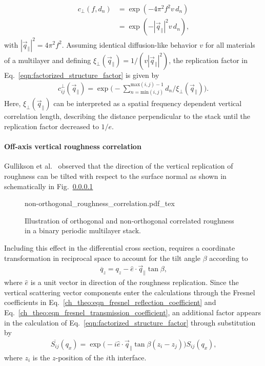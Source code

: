 \begin{align}
    c_\perp(f,d_n) &= \exp(-4\pi^2 f^2 v \,d_n) \nonumber \\
                   &= \exp(-|\vec{q}_\parallel|^2 v \,d_n)\text{,}
\end{align}
with $|\vec{q}_\parallel|^2 = 4 \pi^2 f^2$. Assuming identical diffusion-like behavior $v$ for all materials of a multilayer and defining $\xi_\perp(\vec{q}_\parallel) = 1/(v |\vec{q}_\parallel|^2)$, the replication factor in Eq.~\eqref{eqn:factorized_structure_factor} is given by
\begin{align}
c_{ij}^\perp(\vec{q}_\parallel) =  \exp\Bigg(-\sum \limits_{n = \text{min}(i,j)}^{\text{max}(i,j)-1}d_n/\xi_\perp(\vec{q}_\parallel) \Bigg)\text{.} \label{ch_theo:eqn_replication_factor}
\end{align}
Here, $\xi_\perp(\vec{q}_\parallel)$ can be interpreted as a spatial frequency dependent vertical correlation length, describing the distance perpendicular to the stack until the replication factor decreased to $1/e$.



\paragraph{Off-axis vertical roughness correlation}
Gullikson et al.~\cite{gullikson_asymmetric_1999} observed that the direction of the vertical replication of roughness can be tilted with respect to the surface normal as shown in schematically in Fig.~\ref{}
\begin{figure}[htb]
    \def\svgwidth{\textwidth}
    {non-orthogonal_roughness_correlation.pdf_tex}
    \caption{Illustration of orthogonal and non-orthogonal correlated roughness in a binary periodic multilayer stack.}
    \label{ch_theo:fig_non-orthogonal_vertical_roughness_correlation}
\end{figure}
Including this effect in the differential cross section, requires a coordinate transformation in reciprocal space to account for the tilt angle $\beta$ according to
\begin{align}
\overline{q}_z = q_z - \hat{e} \cdot \vec{q}_\parallel   \tan \beta\text{,}
\end{align}
where $\hat{e}$ is a unit vector in direction of the roughness replication. Since the vertical scattering vector components enter the calculations through the Fresnel coefficients in Eq.~\eqref{ch_theo:eqn_fresnel_reflection_coefficient} and Eq.~\eqref{ch_theo:eqn_fresnel_transmission_coefficient}, an additional factor appears in the calculation of Eq.~\eqref{eqn:factorized_structure_factor} through substitution by
\begin{align}
\overline{S_{ij}}(q_x) = \exp\Big(-i \hat{e} \cdot \vec{q}_\parallel \tan \beta (z_i-z_j)\Big)  S_{ij}(q_x) \text{,} \label{eqn:tilt_correction}
\end{align}
where $z_i$ is the $z$-position of the $i$th interface.

